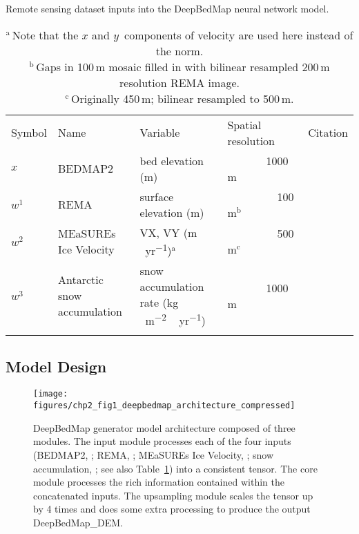 \begin{landscape}
\vspace*{120pt}
\begin{table*}[ht]
  \caption{Remote sensing dataset inputs into the DeepBedMap neural network model.}
  \label{table:datainputs}
  \begin{tabular}{lllll}
  \tophline
  Symbol & Name                        & Variable                                           & Spatial resolution           & Citation                                         \\
  \middlehline
  $x$    & BEDMAP2                     & bed elevation (\unit{m})                           & {~~~~~~~}1000\,\unit{m}               & \citet{FretwellBedmap2improvedice2013}           \\
  $w^1$  & REMA                        & surface elevation (\unit{m})                       & {~~~~~~~~~}100\,\unit{m}$^{\mathrm{b}}$ & \citet{HowatReferenceElevationModel2018}         \\
  $w^2$  & MEaSUREs Ice Velocity       & VX, VY (\unit{m\,yr^{-1}})$^{\mathrm{a}}$          & {~~~~~~~~~}500\,\unit{m}$^{\mathrm{c}}$ & \citet{MouginotContinentWideInterferometric2019} \\
  $w^3$  & Antarctic snow accumulation & snow accumulation rate (\unit{kg\,m^{-2}\,yr^{-1}}) & {~~~~~~~}1000\,\unit{m}               & \citet{ArthernAntarcticsnowaccumulation2006}     \\
  \bottomhline
  \end{tabular}
  \caption*{$^{\mathrm{a}}$\,Note that the $x$ and $y$~components of velocity are used here instead of the norm. \\
  $^{\mathrm{b}}$\,Gaps in 100\,\unit{m} mosaic filled in with bilinear resampled 200\,\unit{m} resolution REMA image. \\
  $^{\mathrm{c}}$\,Originally 450\,\unit{m}; bilinear resampled to 500\,\unit{m}.} %
\end{table*}
\end{landscape}

\subsection{Model Design} \label{section:modeldesign}

\begin{figure*}[ht]
  \texttt{[image: figures/chp2\_fig1\_deepbedmap\_architecture\_compressed]}
  \caption[DeepBedMap generator model architecture]{
    DeepBedMap generator model architecture composed of three modules.
    The input module processes each of the four inputs (BEDMAP2, \citealp{FretwellBedmap2improvedice2013}; REMA, \citealp{HowatReferenceElevationModel2019}; MEaSUREs Ice Velocity, \citealp{MouginotMEaSUREsPhaseMap2019}; snow accumulation, \citealp{ArthernAntarcticsnowaccumulation2006}; see also Table~\ref{table:datainputs}) into a consistent tensor.
    The core module processes the rich information contained within the concatenated inputs.
    The upsampling module scales the tensor up by 4 times and does some extra processing to produce the output DeepBedMap\_DEM.
  }
  \label{fig:1}
\end{figure*}

